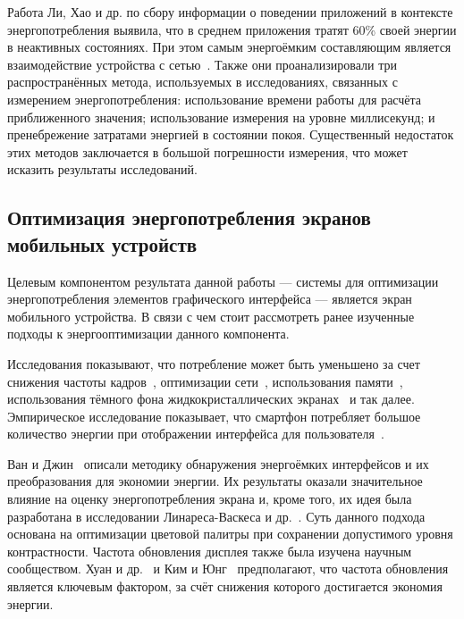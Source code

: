 \documentclass[a4paper,14pt]{extarticle} %
\begin{document}
	Работа Ли, Хао и др. по сбору информации о поведении приложений в контексте энергопотребления выявила, что в среднем приложения тратят 60\% своей энергии в неактивных состояниях. При этом самым энергоёмким составляющим является взаимодействие устройства с сетью~\parencite{li2014empirical}. Также они проанализировали три распространённых метода, используемых в исследованиях, связанных с измерением энергопотребления: использование времени работы для расчёта приближенного значения; использование измерения на уровне миллисекунд; и пренебрежение затратами энергией в состоянии покоя. Существенный недостаток этих методов заключается в большой погрешности измерения, что может исказить результаты исследований.
	
	\subsection{Оптимизация энергопотребления экранов мобильных устройств}
	
	Целевым компонентом результата данной работы --- системы для оптимизации энергопотребления элементов графического интерфейса --- является экран мобильного устройства. В связи с чем стоит рассмотреть ранее изученные подходы к энергооптимизации данного компонента.
	
	Исследования показывают, что потребление может быть уменьшено за счет снижения частоты кадров~\parencite{lee2018improving}, оптимизации сети~\parencite{tuysuz2019real}, использования памяти~\parencite{li2014investigation}, использования тёмного фона жидкокристаллических экранах~\parencite{утин2018адаптивное} и так далее. Эмпирическое исследование показывает, что смартфон потребляет большое количество энергии при отображении интерфейса для пользователя~\parencite{li2014empirical}. 
	
	Ван и Джин~\parencite{wan2015detecting} описали методику обнаружения энергоёмких интерфейсов и их преобразования для экономии энергии. Их результаты оказали значительное влияние на оценку энергопотребления экрана и, кроме того, их идея была разработана в исследовании Линареса-Васкеса и др.~\parencite{linares2018multi}. Суть данного подхода основана на оптимизации цветовой палитры при сохранении допустимого уровня контрастности. Частота обновления дисплея также была изучена научным сообществом. Хуан и др.~\parencite{huang2014intelligent} и Ким и Юнг~\parencite{kim2014content} предполагают, что частота обновления является ключевым фактором, за счёт снижения которого достигается экономия энергии.
	
\end{document}
